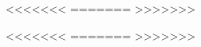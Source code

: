 \documentclass{aa}
\begin{document}
{{{\begin{figure}
{%
<<<<<<<
=======
>>>>>>>


<<<<<<<
=======
>>>>>>>

}
\end{figure}}}}
\end{document}
